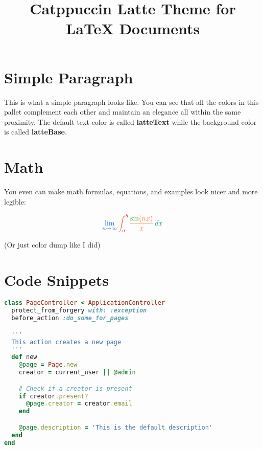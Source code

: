 \documentclass[12pt]{article}
\title{ \Huge \textbf{\textcolor{latteMaroon}{Catppuccin Latte Theme for} \textcolor{latteMauve}{\LaTeX{} Documents}} \vspace{-3em}}
\date{}
\begin{document}
\maketitle

\section{\textcolor{latteBlue}{Simple Paragraph}}
\textcolor{lattePeach}{This is what a simple paragraph looks like.} You can see that all the colors in this pallet complement each other and maintain an elegance all within the same proximity. The default text color is called \textbf{\textcolor{latteGreen}{latteText}} while the background color is called \textbf{\textcolor{latteGreen}{latteBase}}.

\section{\textcolor{latteBlue}{Math}}

You even can make math formulas, equations, and examples look nicer and more legible:


\[\large{
    \textcolor{latteBlue}{\lim_{{n \to \infty}} \textcolor{lattePeach}{\int_{\textcolor{latteRed}{a}}^{\textcolor{latteRed}{b}} \frac{\textcolor{latteGreen}{\sin}(\textcolor{lattePeach}{nx})}{\textcolor{lattePeach}{x}} \, \textcolor{latteTeal}{dx}}}
}\]

\tiny{(Or just color dump like I did)}

\section{\textcolor{latteBlue}{Code Snippets}}

\begin{lstlisting}[language=Ruby,style=ruby_on_rails, caption={A ruby on rails code sample}]
class PageController < ApplicationController
  protect_from_forgery with: :exception
  before_action :do_some_for_pages

  '''
  This action creates a new page
  '''
  def new
    @page = Page.new
    creator = current_user || @admin

    # Check if a creator is present
    if creator.present?
      @page.creator = creator.email
    end

    @page.description = 'This is the default description'
  end
end
\end{lstlisting}
\end{document}
